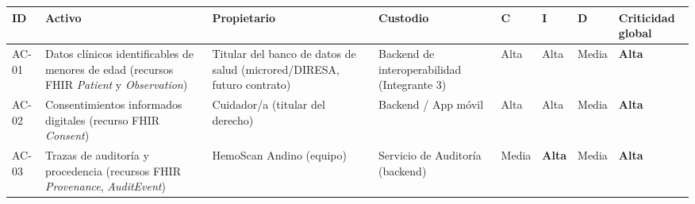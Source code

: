 \documentclass[11pt,a4paper]{article}
\begin{document}
{\small
\begin{longtable}[]{@{}
  >{\raggedright\arraybackslash}p{}
  >{\raggedright\arraybackslash}p{}
  >{\raggedright\arraybackslash}p{}
  >{\raggedright\arraybackslash}p{}
  >{\raggedright\arraybackslash}p{}
  >{\raggedright\arraybackslash}p{}
  >{\raggedright\arraybackslash}p{}
  >{\raggedright\arraybackslash}p{}@{}}
\toprule\noalign{}
\begin{minipage}[b]{\linewidth}\raggedright
ID
\end{minipage} & \begin{minipage}[b]{\linewidth}\raggedright
Activo
\end{minipage} & \begin{minipage}[b]{\linewidth}\raggedright
Propietario
\end{minipage} & \begin{minipage}[b]{\linewidth}\raggedright
Custodio
\end{minipage} & \begin{minipage}[b]{\linewidth}\raggedright
C
\end{minipage} & \begin{minipage}[b]{\linewidth}\raggedright
I
\end{minipage} & \begin{minipage}[b]{\linewidth}\raggedright
D
\end{minipage} & \begin{minipage}[b]{\linewidth}\raggedright
Criticidad global
\end{minipage} \\
\midrule\noalign{}
\endhead
\bottomrule\noalign{}
\endlastfoot
AC-01 & Datos clínicos identificables de menores de edad (recursos FHIR \emph{Patient} y \emph{Observation}) & Titular del banco de datos de salud (microred/DIRESA, futuro contrato) & Backend de interoperabilidad (Integrante 3) & Alta & Alta & Media & \textbf{Alta} \\
AC-02 & Consentimientos informados digitales (recurso FHIR \emph{Consent}) & Cuidador/a (titular del derecho) & Backend / App móvil & Alta & Alta & Media & \textbf{Alta} \\
AC-03 & Trazas de auditoría y procedencia (recursos FHIR \emph{Provenance}, \emph{AuditEvent}) & HemoScan Andino (equipo) & Servicio de Auditoría (backend) & Media & \textbf{Alta} & Media & \textbf{Alta} \\

\end{longtable}}
\end{document}
